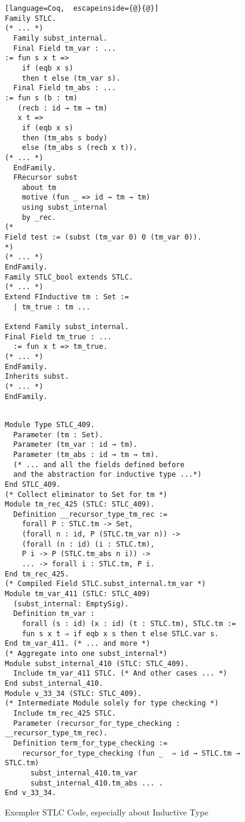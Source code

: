 \begin{figure}[!htb]
  \begin{minipage}[t]{0.32\linewidth}
\begin{lstlisting}[language=Coq,  escapeinside={@}{@}]
Family STLC.
(* ... *)
  Family subst_internal. 
  Final Field tm_var : ...
:= fun s x t => 
    if (eqb x s) 
    then t else (tm_var s).
  Final Field tm_abs : ...
:= fun s (b : tm)   
   (recb : id → tm → tm) 
   x t => 
    if (eqb x s) 
    then (tm_abs s body)
    else (tm_abs s (recb x t)).
(* ... *)
  EndFamily.
  FRecursor subst 
    about tm 
    motive (fun _ => id → tm → tm)
    using subst_internal
    by _rec.
(*
Field test := (subst (tm_var 0) 0 (tm_var 0)).
*)
(* ... *)
EndFamily.
Family STLC_bool extends STLC.
(* ... *)
Extend FInductive tm : Set :=
  | tm_true : tm ...

Extend Family subst_internal.
Final Field tm_true : ...
  := fun x t => tm_true.
(* ... *)
EndFamily. 
Inherits subst.
(* ... *)
EndFamily.
\end{lstlisting}
  \end{minipage}
  \begin{minipage}[t]{0.65\linewidth}
\begin{verbatim}

Module Type STLC_409.
  Parameter (tm : Set).
  Parameter (tm_var : id → tm).
  Parameter (tm_abs : id → tm → tm).
  (* ... and all the fields defined before
  and the abstraction for inductive type ...*)
End STLC_409.
(* Collect eliminator to Set for tm *)
Module tm_rec_425 (STLC: STLC_409).
  Definition __recursor_type_tm_rec :=
    forall P : STLC.tm -> Set,
    (forall n : id, P (STLC.tm_var n)) ->
    (forall (n : id) (i : STLC.tm),
    P i -> P (STLC.tm_abs n i)) ->
    ... -> forall i : STLC.tm, P i.
End tm_rec_425.
(* Compiled Field STLC.subst_internal.tm_var *)
Module tm_var_411 (STLC: STLC_409)
  (subst_internal: EmptySig).
  Definition tm_var :
    forall (s : id) (x : id) (t : STLC.tm), STLC.tm :=
    fun s x t ⇒ if eqb x s then t else STLC.var s.
End tm_var_411. (* ... and more *)
(* Aggregate into one subst_internal*)
Module subst_internal_410 (STLC: STLC_409). 
  Include tm_var_411 STLC. (* And other cases ... *)
End subst_internal_410.
Module v_33_34 (STLC: STLC_409).
(* Intermediate Module solely for type checking *)
  Include tm_rec_425 STLC.
  Parameter (recursor_for_type_checking : __recursor_type_tm_rec).
  Definition term_for_type_checking :=
    recursor_for_type_checking (fun _  ⇒ id → STLC.tm → STLC.tm)
      subst_internal_410.tm_var
      subst_internal_410.tm_abs ... .
End v_33_34.
\end{verbatim}
  \end{minipage}
\caption{Exempler STLC Code, especially about Inductive Type}\label{fig:plugin-example2}
\end{figure}



